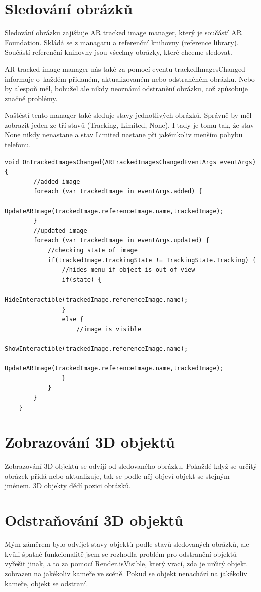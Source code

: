 \documentclass[12pt, a4paper,
twoside,        %
openright
]{report}
\begin{document}
\newpage

\section {Sledování obrázků}
\label{sec:sledovani_obrazku}
 Sledování obrázku zajišťuje AR tracked image manager, který je součástí AR Foundation. Skládá se z managaru a referenční knihovny (reference library). Součástí referenční knihovny jsou všechny obrázky, které chceme sledovat.
 
AR tracked image manager nás také za pomocí eventu trackedImagesChanged informuje o~každém přidaném, aktualizovaném nebo odstraněném obrázku. Nebo by alespoň měl, bohužel ale nikdy neoznámí odstranění obrázku, což způsobuje značné problémy. 

Naštěstí tento manager také sleduje stavy jednotlivých obrázků. Správně by měl zobrazit jeden ze tří stavů (Tracking, Limited, None). I tady je tomu tak, že stav None nikdy nenastane a stav Limited nastane při jakémkoliv menším pohybu telefonu. 


\begin{lstlisting}[style=csh, caption={Ukázka kódu sledování obrázků.}]
	void OnTrackedImagesChanged(ARTrackedImagesChangedEventArgs eventArgs) {
		//added image
		foreach (var trackedImage in eventArgs.added) {
			UpdateARImage(trackedImage.referenceImage.name,trackedImage);
		}
		//updated image
		foreach (var trackedImage in eventArgs.updated) {
			//checking state of image
			if(trackedImage.trackingState != TrackingState.Tracking) {
				//hides menu if object is out of view
				if(state) {
					HideInteractible(trackedImage.referenceImage.name);	
				}
				else {
					//image is visible
					ShowInteractible(trackedImage.referenceImage.name);
					UpdateARImage(trackedImage.referenceImage.name,trackedImage);
				}
			}
		}
	}
\end{lstlisting}


\newpage

\section {Zobrazování 3D objektů}
\label{sec:zobrazovani_3d_objektu}
Zobrazování 3D objektů se odvíjí od sledovaného obrázku. Pokaždé když se určitý obrázek přidá nebo aktualizuje, tak se podle něj objeví objekt se stejným jménem. 3D objekty dědí pozici obrázků. 

\section{Odstraňování 3D objektů}
\label{sec:odstraneni_3d_objektu}
Mým záměrem bylo odvíjet stavy objektů podle stavů sledovaných obrázků, ale kvůli špatné funkcionalitě jsem se rozhodla problém pro odstranění objektů vyřešit jinak, a to za pomocí Render.isVisible, který vrací, zda je určitý objekt zobrazen na jakékoliv kameře ve scéně. Pokud se objekt nenachází na jakékoliv kameře, objekt se odstraní. 
\end{document}
